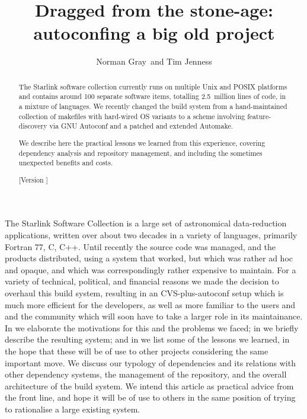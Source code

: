 \documentclass{speauth}
\begin{document}


\title{Dragged from the stone-age: autoconfing a big old project}

\author{Norman Gray\comma\corrauth\ and Tim Jenness}

\noreceived{}
\norevised{}
\noaccepted{}



\begin{abstract}
The Starlink software collection currently runs on multiple
Unix and POSIX platforms and contains around 100 separate software items,
totalling 2.5~million lines of code, in a mixture of languages.  We
recently changed the build system from a hand-maintained collection of
makefiles with hard-wired OS variants to a scheme involving
feature-discovery via GNU Autoconf and a patched and extended Automake.

We describe here the practical lessons we learned from this
experience, covering dependency analysis and repository management,
and including the sometimes unexpected benefits and costs.

[Version \RCSRevision]
\end{abstract}



The Starlink Software Collection \cite{draper05} is a large set of
astronomical data-reduction applications, written over about two
decades in a variety of languages, primarily Fortran 77, C, C++.  Until
recently the source code was managed, and the
products distributed, using a system that worked, but which was
rather ad hoc and opaque, and which was correspondingly rather
expensive to maintain.  For a variety of technical, political, and financial
reasons we made the decision to overhaul this build system, resulting
in an CVS-plus-autoconf setup which is much more efficient for the
developers, as well as more familiar to the users and and the
community which will soon have to take a larger role in its maintainance.
In  we elaborate the 
motivations for this and the problems we faced; in
 we briefly describe the resulting system; and
in  we list some of the lessons we learned, in
the hope that these will be of use to other projects considering the
same important move.  We discuss our typology of dependencies and its
relations with other dependency systems, the management of the
repository, and the overall architecture of the build system.
We intend this article as practical advice from the front line, and
hope it will be of use to others in the same position of trying to
rationalise a large existing system.
\end{document}
